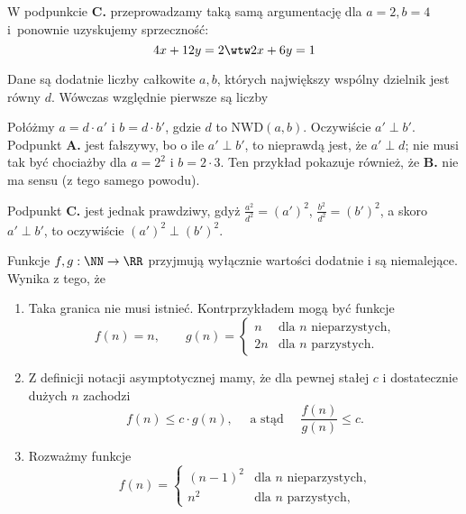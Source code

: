 \begin{solutions}
    W podpunkcie \textbf{C.} przeprowadzamy taką samą argumentację dla $a = 2, b = 4$ i~ponownie uzyskujemy sprzeczność: $$4x + 12y = 2 \wtw 2x + 6y = 1$$
    
    \sol Dane są dodatnie liczby całkowite $a, b$, których największy wspólny dzielnik jest równy $d$. Wówczas względnie pierwsze są liczby
    
    Połóżmy $a=d\cdot a'$ i $b=d\cdot b'$, gdzie $d$ to $\mathrm{NWD}(a,b)$. Oczywiście $a'\perp b'$. Podpunkt \textbf{A.} jest fałszywy, bo o ile $a'\perp b'$, to nieprawdą jest, że $a'\perp d$; nie musi tak być chociażby dla $a=2^2$ i $b=2\cdot3$. Ten przykład pokazuje również, że \textbf{B.} nie ma sensu (z tego samego powodu).
    
    Podpunkt \textbf{C.} jest jednak prawdziwy, gdyż $\frac{a^2}{d^2}=(a')^2$, $\frac{b^2}{d^2}=(b')^2$, a skoro $a'\perp b'$, to oczywiście $(a')^2\perp (b')^2$.

    \sol Funkcje $f, g: \NN \rightarrow \RR$ przyjmują wyłącznie wartości dodatnie i są niemalejące. Wynika z tego, że

    \begin{enumerate}[\bf A.]
        \item Taka granica nie musi istnieć. Kontrprzykładem mogą być funkcje
        $$f(n) = n, \qquad g(n) = \begin{cases}
            n & \text{dla } n \text{ nieparzystych,} \\
            2n & \text{dla } n \text{ parzystych.}
        \end{cases}$$
        
        \item Z definicji notacji asymptotycznej mamy, że dla pewnej stałej $c$ i dostatecznie dużych $n$ zachodzi $$f(n) \leq c \cdot g(n), \quad \text{ a stąd } \quad \frac{f(n)}{g(n)} \leq c.$$ 

        \item Rozważmy funkcje
        $$
        f(n) = 
        \begin{cases}
            (n - 1)^2 & \text{dla } n \text{ nieparzystych,} \\
            n^2 & \text{dla } n \text{ parzystych,}
        \end{cases}
        $$
    

\end{enumerate}
\end{solutions}

